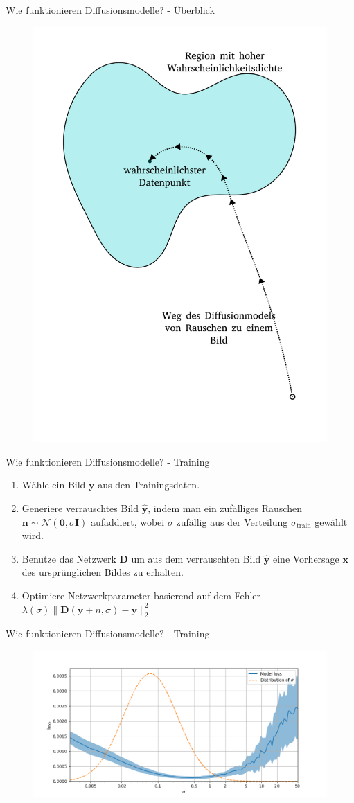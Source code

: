 \begin{frame}{Wie funktionieren Diffusionsmodelle? - Überblick}
\vspace*{\fill}
\begin{figure}
        \includegraphics[width=.35\textwidth]{imgs/samplingpath.png}
\end{figure}    
\vspace*{\fill}
\end{frame}
\begin{frame}{Wie funktionieren Diffusionsmodelle? - Training}
	\begin{enumerate}
		\item Wähle ein Bild $\boldsymbol y$ aus den Trainingsdaten.	
		\item Generiere verrauschtes Bild $\hat{\boldsymbol y}$, indem man ein zufälliges Rauschen $\boldsymbol n \sim \mathcal{N}(\boldsymbol 0, \sigma \boldsymbol I)$ aufaddiert, wobei $\sigma$ zufällig aus der Verteilung $\sigma_{\text{train}}$ gewählt wird.
		\item Benutze das Netzwerk $\boldsymbol D$ um aus dem verrauschten Bild $\hat{\boldsymbol y}$ eine Vorhersage $\boldsymbol x$ des ursprünglichen Bildes zu erhalten.
		\item Optimiere Netzwerkparameter basierend auf dem Fehler $\lambda(\sigma) \lVert \boldsymbol D(\boldsymbol y + n, \sigma) - \boldsymbol y \rVert^2_2$
	\end{enumerate}
\end{frame}

\begin{frame}{Wie funktionieren Diffusionsmodelle? - Training}
\vspace*{\fill}
\begin{figure}
        \includegraphics[width=.8\textwidth]{imgs/sigma_loss.png}
\end{figure}    
\vspace*{\fill}
\end{frame}

